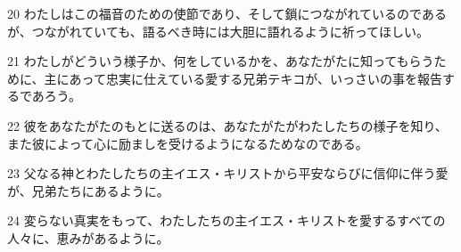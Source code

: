 \par 20 わたしはこの福音のための使節であり、そして鎖につながれているのであるが、つながれていても、語るべき時には大胆に語れるように祈ってほしい。
\par 21 わたしがどういう様子か、何をしているかを、あなたがたに知ってもらうために、主にあって忠実に仕えている愛する兄弟テキコが、いっさいの事を報告するであろう。
\par 22 彼をあなたがたのもとに送るのは、あなたがたがわたしたちの様子を知り、また彼によって心に励ましを受けるようになるためなのである。
\par 23 父なる神とわたしたちの主イエス・キリストから平安ならびに信仰に伴う愛が、兄弟たちにあるように。
\par 24 変らない真実をもって、わたしたちの主イエス・キリストを愛するすべての人々に、恵みがあるように。


